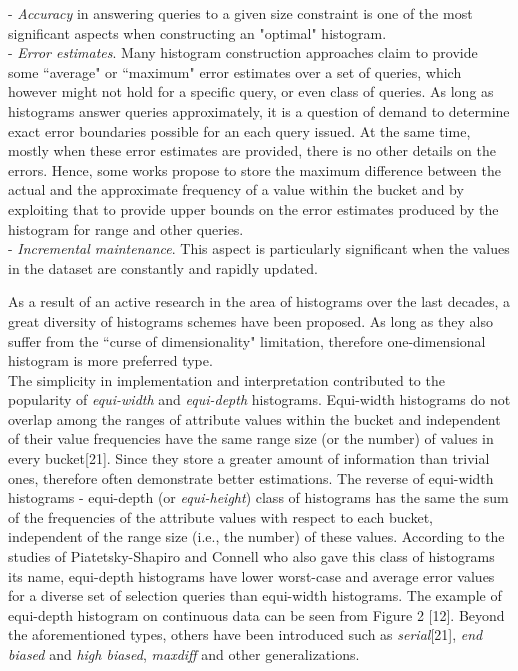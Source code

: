 \documentclass[10pt, conference, compsocconf]{IEEEtran}
\begin{document}
- \textit{Accuracy} in answering queries to a given size constraint is one of the most significant aspects when constructing an "optimal" histogram. \\
- \textit{Error estimates}. Many histogram construction approaches claim to provide some ``average" or ``maximum" error estimates over a set of queries, which however might not hold for a specific query, or even class of queries. As long as histograms answer queries approximately, it is a question of demand to determine exact error boundaries possible for an each query issued. At the same time, mostly when these error estimates are provided, there is no other details on the errors. Hence, some works propose to store the maximum difference between the actual and the approximate frequency of a value within the bucket and by exploiting that to provide upper bounds on the error estimates produced by the histogram for range and other queries.\\
- \textit{Incremental maintenance}. This aspect is particularly significant when the values in the dataset are constantly and rapidly updated.

As a result of an active research in the area of histograms over the last decades, a great diversity of histograms schemes have been proposed.  
As long as they also suffer from the ``curse of dimensionality" limitation, therefore one-dimensional histogram is more preferred type. \\The simplicity in implementation and interpretation contributed to the popularity of \textit{equi-width} and \textit{equi-depth} histograms. Equi-width histograms do not overlap among the ranges of attribute values within the bucket and independent of their value frequencies have the same range size (or the number) of values in every bucket[21]. Since they store a greater amount of information than trivial ones, therefore often demonstrate better estimations. The reverse of equi-width histograms - equi-depth (or \textit{equi-height}) class of histograms has the same the sum of the frequencies of the attribute values with respect to each bucket, independent of the range size (i.e., the number) of these values. According to the studies of Piatetsky-Shapiro and Connell who also gave this class of histograms its name, equi-depth histograms have lower worst-case and average error values for a diverse set of selection queries than equi-width histograms. The example of equi-depth histogram on continuous data can be seen from Figure 2 [12].
Beyond the aforementioned types, others have been introduced such as \textit{serial}[21], \textit{end biased} and \textit{high biased}, \textit{maxdiff} and other generalizations. 
\end{document}

